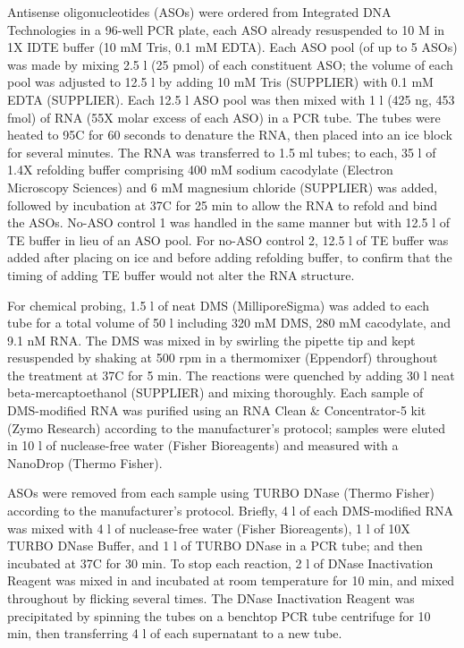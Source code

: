 \documentclass[main.tex]{subfiles}
\begin{document}
Antisense oligonucleotides (ASOs) were ordered from Integrated DNA Technologies in a 96-well PCR plate, each ASO already resuspended to 10 \textmu M in 1X IDTE buffer (10 mM Tris, 0.1 mM EDTA).
Each ASO pool (of up to 5 ASOs) was made by mixing 2.5 \textmu l (25 pmol) of each constituent ASO; the volume of each pool was adjusted to 12.5 \textmu l by adding 10 mM Tris (SUPPLIER) with 0.1 mM EDTA (SUPPLIER).
Each 12.5 \textmu l ASO pool was then mixed with 1 \textmu l (425 ng, 453 fmol) of RNA (55X molar excess of each ASO) in a PCR tube.
The tubes were heated to 95\textdegree C for 60 seconds to denature the RNA, then placed into an ice block for several minutes.
The RNA was transferred to 1.5 ml tubes; to each, 35 \textmu l of 1.4X refolding buffer comprising 400 mM sodium cacodylate (Electron Microscopy Sciences) and 6 mM magnesium chloride (SUPPLIER) was added, followed by incubation at 37\textdegree C for 25 min to allow the RNA to refold and bind the ASOs.
No-ASO control 1 was handled in the same manner but with 12.5 \textmu l of TE buffer in lieu of an ASO pool.
For no-ASO control 2, 12.5 \textmu l of TE buffer was added after placing on ice and before adding refolding buffer, to confirm that the timing of adding TE buffer would not alter the RNA structure.

For chemical probing, 1.5 \textmu l of neat DMS (MilliporeSigma) was added to each tube for a total volume of 50 \textmu l including 320 mM DMS, 280 mM cacodylate, and 9.1 nM RNA.
The DMS was mixed in by swirling the pipette tip and kept resuspended by shaking at 500 rpm in a thermomixer (Eppendorf) throughout the treatment at 37\textdegree C for 5 min.
The reactions were quenched by adding 30 \textmu l neat beta-mercaptoethanol (SUPPLIER) and mixing thoroughly.
Each sample of DMS-modified RNA was purified using an RNA Clean \& Concentrator-5 kit (Zymo Research) according to the manufacturer's protocol; samples were eluted in 10 \textmu l of nuclease-free water (Fisher Bioreagents) and measured with a NanoDrop (Thermo Fisher).

ASOs were removed from each sample using TURBO DNase (Thermo Fisher) according to the manufacturer's protocol.
Briefly, 4 \textmu l of each DMS-modified RNA was mixed with 4 \textmu l of nuclease-free water (Fisher Bioreagents), 1 \textmu l of 10X TURBO DNase Buffer, and 1 \textmu l of TURBO DNase in a PCR tube; and then incubated at 37\textdegree C for 30 min.
To stop each reaction, 2 \textmu l of DNase Inactivation Reagent was mixed in and incubated at room temperature for 10 min, and mixed throughout by flicking several times.
The DNase Inactivation Reagent was precipitated by spinning the tubes on a benchtop PCR tube centrifuge for 10 min, then transferring 4 \textmu l of each supernatant to a new tube.
\end{document}
